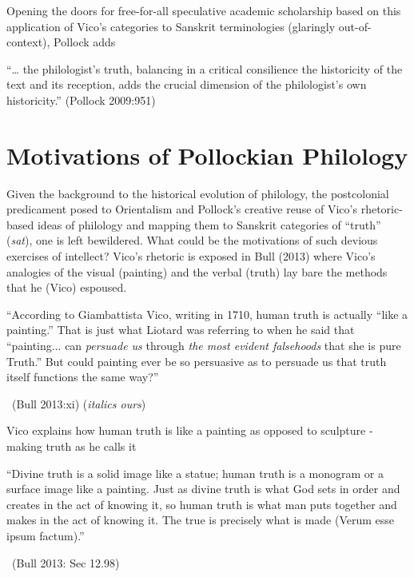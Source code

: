 Opening the doors for free-for-all speculative academic scholarship based on this application of Vico’s categories to Sanskrit terminologies (glaringly out-of-context), Pollock adds

\newpage

\begin{myquote}
“… the philologist’s truth, balancing in a critical consilience the historicity of the text and its reception, adds the crucial dimension of the philologist’s own historicity.” (Pollock 2009:951)
\end{myquote}


\section*{Motivations of Pollockian Philology}

Given the background to the historical evolution of philology, the postcolonial predicament posed to Orientalism and Pollock’s creative reuse of Vico’s rhetoric-based ideas of philology and mapping them to Sanskrit categories of “truth” (\textit{sat}), one is left bewildered. What could be the motivations of such devious exercises of intellect? Vico’s rhetoric is exposed in Bull (2013) where Vico’s analogies of the visual (painting) and the verbal (truth) lay bare the methods that he (Vico) espoused.

\begin{myquote}
“According to Giambattista Vico, writing in 1710, human truth is actually “like a painting.” That is just what Liotard was referring to when he said that “painting... can \textit{persuade us} through \textit{the most evident falsehoods} that she is pure Truth.” But could painting ever be so persuasive as to persuade us that truth itself functions the same way?”

~\hfill (Bull 2013:xi) (\textit{italics ours})
\end{myquote}

Vico explains how human truth is like a painting as opposed to sculpture - making truth as he calls it

\begin{myquote}
“Divine truth is a solid image like a statue; human truth is a monogram or a surface image like a painting. Just as divine truth is what God sets in order and creates in the act of knowing it, so human truth is what man puts together and makes in the act of knowing it. The true is precisely what is made (Verum esse ipsum factum).”

~\hfill (Bull 2013: Sec 12.98)
\end{myquote}

